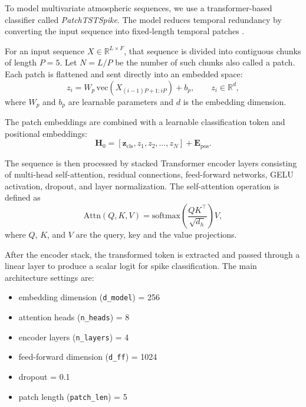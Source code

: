 \documentclass[runningheads]{llncs}
\begin{document}
To model multivariate atmospheric sequences, we use a transformer-based classifier called \textit{PatchTSTSpike}. The model reduces temporal redundancy by converting the input sequence into fixed-length temporal patches \cite{patchtst}.

For an input sequence $X \in \mathbb{R}^{L \times F}$, that sequence is divided into contiguous chunks  of length $P=5$. Let $N=L/P$ be the number of such chunks also called a patch. Each patch is flattened and sent directly into an embedded space:
\begin{equation}
z_i = W_p \,\mathrm{vec}(X_{(i-1)P+1:iP}) + b_p, \qquad z_i \in \mathbb{R}^{d},
\end{equation}
where $W_p$ and $b_p$ are learnable parameters and $d$ is the embedding dimension.

The patch embeddings are combined with a learnable classification token and positional embeddings:
\begin{equation}
\mathbf{H}_0 = [\mathbf{z}_{\mathrm{cls}}, z_1, z_2, \dots, z_N] + \mathbf{E}_{\mathrm{pos}}.
\end{equation}

The sequence is then processed by stacked Transformer encoder layers consisting of multi-head self-attention, residual connections, feed-forward networks, GELU activation, dropout, and layer normalization. The self-attention operation is defined as
\begin{equation}
\mathrm{Attn}(Q,K,V)=\mathrm{softmax}\left(\frac{QK^\top}{\sqrt{d_h}}\right)V,
\end{equation}
where $Q$, $K$, and $V$ are the query, key and the value projections.

After the encoder stack, the transformed token is extracted and passed through a linear layer to produce a scalar logit for spike classification. The main architecture settings are:

\begin{itemize}
\item embedding dimension (\texttt{d\_model}) = 256
\item attention heads (\texttt{n\_heads}) = 8
\item encoder layers (\texttt{n\_layers}) = 4
\item feed-forward dimension (\texttt{d\_ff}) = 1024
\item dropout = 0.1
\item patch length (\texttt{patch\_len}) = 5
\end{itemize}
\end{document}
